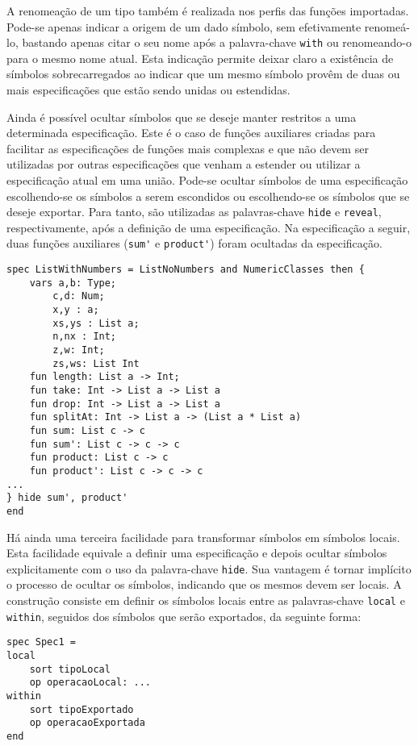 A renomeação de um tipo também é realizada nos perfis das funções importadas.
Pode-se apenas indicar a origem de um dado símbolo, sem efetivamente renomeá-lo, bastando apenas citar o seu nome após a palavra-chave \Verb.with. ou renomeando-o para o mesmo nome atual.
Esta indicação permite deixar claro a existência de símbolos sobrecarregados ao indicar que um mesmo símbolo provêm de duas ou mais especificações que estão sendo unidas ou estendidas.

Ainda é possível ocultar símbolos que se deseje manter restritos a uma determinada especificação.
Este é o caso de funções auxiliares criadas para facilitar as especificações de funções mais complexas e que não devem ser utilizadas por outras especificações que venham a estender ou utilizar a especificação atual em uma união.
Pode-se ocultar símbolos de uma especificação escolhendo-se os símbolos a serem escondidos ou escolhendo-se os símbolos que se deseje exportar.
Para tanto, são utilizadas as palavras-chave \Verb.hide. e \Verb.reveal., respectivamente, após a definição de uma especificação.
Na especificação a seguir, duas funções auxiliares (\Verb.sum'. e \Verb.product'.) foram ocultadas da especificação.
\begin{Verbatim}
spec ListWithNumbers = ListNoNumbers and NumericClasses then {
    vars a,b: Type;
        c,d: Num;
        x,y : a;
        xs,ys : List a;
        n,nx : Int;
        z,w: Int;
        zs,ws: List Int
    fun length: List a -> Int;
    fun take: Int -> List a -> List a
    fun drop: Int -> List a -> List a
    fun splitAt: Int -> List a -> (List a * List a)
    fun sum: List c -> c
    fun sum': List c -> c -> c
    fun product: List c -> c
    fun product': List c -> c -> c
...
} hide sum', product'
end
\end{Verbatim}

Há ainda uma terceira facilidade para transformar símbolos em símbolos locais.
Esta facilidade equivale a definir uma especificação e depois ocultar símbolos explicitamente com o uso da palavra-chave \Verb.hide..
Sua vantagem é tornar implícito o processo de ocultar os símbolos, indicando que os mesmos devem ser locais.
A construção consiste em definir os símbolos locais entre as palavras-chave \Verb.local. e \Verb.within., seguidos dos símbolos que serão exportados, da seguinte forma:
\begin{Verbatim}
spec Spec1 = 
local 
    sort tipoLocal
    op operacaoLocal: ...
within
    sort tipoExportado
    op operacaoExportada
end
\end{Verbatim}

